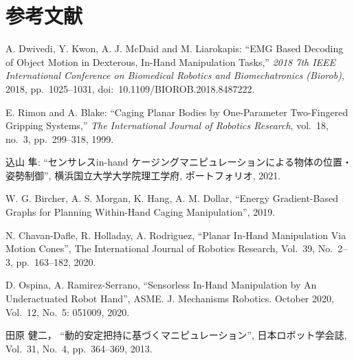 \documentclass[a4paper,twoside,12pt,papersize, dvipdfmx]{iirthesis}
\begin{document}
    \newcommand{\figref}[1]{\figurename\ref{#1}}
    \newcommand{\tabref}[1]{\tablename\ref{#1}}
    \renewcommand{\eqref}[1]{式~(\ref{#1})}
    \newcommand{\chapref}[1]{\ref{#1}章}
    \newcommand{\secref}[1]{\ref{#1}節}
    \newcommand{\ssecref}[1]{\ref{#1}項}
    \newcommand{\appref}[1]{付録\ref{#1}}
\fi

\chapter{参考文献}\label{chap:bibliography}

\begin{thebibliography}{}
A. Dwivedi, Y. Kwon, A. J. McDaid and M. Liarokapis:
``EMG Based Decoding of Object Motion in Dexterous, In-Hand Manipulation Tasks,''
{\it 2018 7th IEEE International Conference on Biomedical Robotics and Biomechatronics (Biorob)},
2018, pp.~1025--1031, doi:~10.1109/BIOROB.2018.8487222.

E. Rimon and A. Blake:
``Caging Planar Bodies by One-Parameter Two-Fingered Gripping Systems,''
{\it The International Journal of Robotics Research}, vol.~18, no.~3, pp.~299--318, 1999.

込山 隼:
``センサレスin-hand ケージングマニピュレーションによる物体の位置・姿勢制御'',
横浜国立大学大学院理工学府, ポートフォリオ, 2021.
  


	W. G. Bircher, A. S. Morgan, K. Hang, A. M. Dollar,
  	``Energy Gradient-Based Graphs for Planning Within-Hand Caging Manipulation'',
  	2019.
    
 	N. Chavan-Dafle, R. Holladay, A. Rodriguez,
  	``Planar In-Hand Manipulation Via Motion Cones'',
  	 The International Journal of Robotics Research,
  	 Vol.~39, No.~2--3, pp.~163--182,
  	2020.
  	
	D. Ospina, A. Ramirez-Serrano,
  	``Sensorless In-Hand Manipulation by An Underactuated Robot Hand'',
  	 ASME. J. Mechanisms Robotics. October 2020,
  	 Vol.~12, No.~5: 051009, 
  	2020.

	田原 健二，
  	``動的安定把持に基づくマニピュレーション'',
  	 日本ロボット学会誌,
  	 Vol.~31, No.~4, pp.~364--369,
  	2013.  	


\end{thebibliography}
\end{document}
